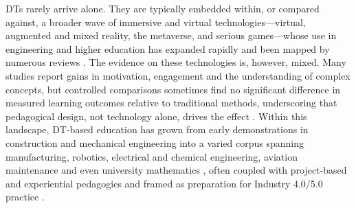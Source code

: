 DTs rarely arrive alone. They are typically embedded within, or compared against,
a broader wave of immersive and virtual technologies---virtual, augmented and mixed
reality, the metaverse, and serious games---whose use in engineering and higher
education has expanded rapidly and been mapped by numerous reviews
\citep{lampropoulos_virtual_2025, jin_extended_2026, fan_impacts_2025, espinoza_virtual_2025, llanos-ruiz_virtual_2025}. The evidence on these
technologies is, however, mixed. Many studies report gains in motivation,
engagement and the understanding of complex concepts, but controlled comparisons
sometimes find no significant difference in measured learning outcomes relative
to traditional methods, underscoring that pedagogical design, not technology
alone, drives the effect \citep{giussani_study_2025, yindeemak_emerging_2026, lainidis_systematic_2026}. Within this landscape, DT-based education has
grown from early demonstrations in construction and mechanical engineering
\citep{sepasgozar_digital_2020, liljaniemi_using_2020, treffinger_investigations_2022}
into a varied corpus spanning manufacturing, robotics, electrical and chemical
engineering, aviation maintenance and even university mathematics
\citep{khan_teaching_2026, kwateng_enhancing_2026, hunpinyo_isa95_2026, xiang_research_2025, bolanos_design_2026, lee_digital_2023}, often coupled with
project-based and experiential pedagogies and framed as preparation for
Industry 4.0/5.0 practice \citep{zhang_effectiveness_2024, ruppert_demonstration_2023, terkaj_virtual_2024, alvarez_ariza_investigating_2026}.

